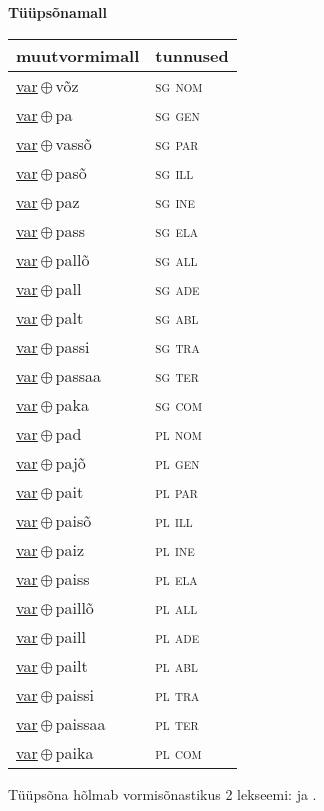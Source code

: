 

\vspace{3.5em}
\noindent \begin{minipage}{\textwidth}
\noindent \textbf{Tüüpsõnamall \,}\\

\begin{sideways}
\begin{tabular}{l l}
muutvormimall & tunnused \\
\hline
\underline{var}\,$\oplus$\,võz & \textsc{ sg nom } \\
\underline{var}\,$\oplus$\,pa & \textsc{ sg gen } \\
\underline{var}\,$\oplus$\,vassõ & \textsc{ sg par } \\
\underline{var}\,$\oplus$\,pasõ & \textsc{ sg ill } \\
\underline{var}\,$\oplus$\,paz & \textsc{ sg ine } \\
\underline{var}\,$\oplus$\,pass & \textsc{ sg ela } \\
\underline{var}\,$\oplus$\,pallõ & \textsc{ sg all } \\
\underline{var}\,$\oplus$\,pall & \textsc{ sg ade } \\
\underline{var}\,$\oplus$\,palt & \textsc{ sg abl } \\
\underline{var}\,$\oplus$\,passi & \textsc{ sg tra } \\
\underline{var}\,$\oplus$\,passaa & \textsc{ sg ter } \\
\underline{var}\,$\oplus$\,paka & \textsc{ sg com } \\
\underline{var}\,$\oplus$\,pad & \textsc{ pl nom } \\
\underline{var}\,$\oplus$\,pajõ & \textsc{ pl gen } \\
\underline{var}\,$\oplus$\,pait & \textsc{ pl par } \\
\underline{var}\,$\oplus$\,paisõ & \textsc{ pl ill } \\
\underline{var}\,$\oplus$\,paiz & \textsc{ pl ine } \\
\underline{var}\,$\oplus$\,paiss & \textsc{ pl ela } \\
\underline{var}\,$\oplus$\,paillõ & \textsc{ pl all } \\
\underline{var}\,$\oplus$\,paill & \textsc{ pl ade } \\
\underline{var}\,$\oplus$\,pailt & \textsc{ pl abl } \\
\underline{var}\,$\oplus$\,paissi & \textsc{ pl tra } \\
\underline{var}\,$\oplus$\,paissaa & \textsc{ pl ter } \\
\underline{var}\,$\oplus$\,paika & \textsc{ pl com } \\
\end{tabular}
\end{sideways}
\label{tab:tüüpsõnamall-varvõz}

\end{minipage}

 
\vspace{1em}
\noindent Tüüpsõna hõlmab vormisõnastikus 2 lekseemi:  ja .

